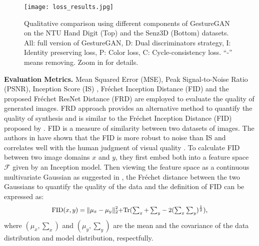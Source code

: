 \documentclass[sigconf]{acmart}
\begin{document}
\begin{figure*}[!t] \tiny
	\centering
	\texttt{[image: loss\_results.jpg]}
	\caption{Qualitative comparison using different components of GestureGAN on the NTU Hand Digit (Top) and the Senz3D (Bottom) datasets.  All: full version of GestureGAN, D: Dual discriminators strategy, I: Identity preserving loss, P: Color loss, C: Cycle-consistency loss. ``-'' means removing. Zoom in for details.}
	\label{fig:loss}
\end{figure*}


\noindent\textbf{Evaluation Metrics.}
Mean Squared Error (MSE), Peak Signal-to-Noise Ratio (PSNR), Inception Score (IS) \cite{salimans2016improved}, Fr\'echet Inception Distance (FID) \cite{heusel2017gans} and the proposed Fr\'echet ResNet Distance (FRD) are employed to evaluate the quality of generated images.
FRD approach provides an alternative method to quantify the quality of synthesis and is similar to the Fr\'echet Inception Distance (FID) proposed by \cite{heusel2017gans}.
FID is a measure of similarity between two datasets of images. 
The authors in \cite{heusel2017gans} have shown that the FID is more robust to noise than IS \cite{salimans2016improved} and  correlates well with the human judgment of visual quality \cite{heusel2017gans}.
To calculate FID \cite{heusel2017gans} between two image domains $x$ and $y$, they first embed both into a feature space $\mathcal{F}$ given by an Inception model.
Then viewing the feature space as a continuous multivariate Gaussian as suggested in \cite{heusel2017gans}, the Fr\'echet distance between the two Gaussians to quantify the quality of the data and the definition of FID can be expressed as:
\begin{equation} \small
\begin{aligned}
\mathrm{FID}(x, y) = \lVert \mu_x - \mu_y \lVert_2^2 + \mathrm{Tr}(\textstyle{\sum_x + \sum_y} - 2 (\textstyle{\sum_x \sum_y})^{\frac{1}{2}}),
\end{aligned}
\label{eqn:fid}
\end{equation}
where $( \mu_x, \textstyle{\sum_x})$ and $(\mu_y, \textstyle{\sum_y})$ are the mean and the covariance of the data distribution and model distribution, respectfully.
\end{document}
